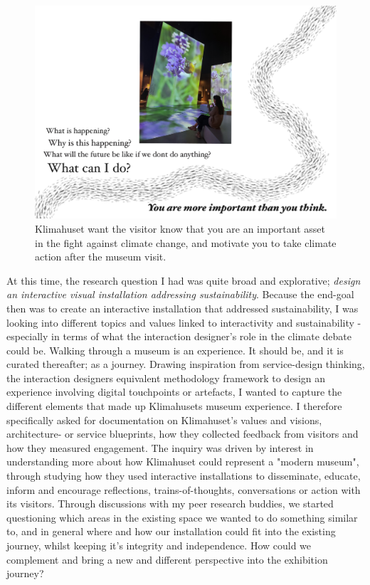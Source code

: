 \begin{figure}[H]
\includegraphics[width=12cm]{pictures/klimahuset/important.jpg}
\caption{Klimahuset want the visitor know that you are an important asset in the fight against climate change, and motivate you to take climate action after the museum visit.}
\centering 
\end{figure}

At this time, the research question I had was quite broad and explorative; \emph{design an interactive visual installation addressing sustainability}. Because the end-goal then was to create an interactive installation that addressed sustainability, I was looking into different topics and values linked to interactivity and sustainability - especially in terms of what the interaction designer's role in the climate debate could be. Walking through a museum is an experience. It should be, and it is curated thereafter; as a journey. Drawing inspiration from service-design thinking, the interaction designers equivalent methodology framework to design an experience involving digital touchpoints or artefacts, I wanted to capture the different elements that made up Klimahusets museum experience. I therefore specifically asked for documentation on Klimahuset's values and visions, architecture- or service blueprints, how they collected feedback from visitors and how they measured engagement. The inquiry was driven by interest in understanding more about how Klimahuset could represent a "modern museum", through studying how they used interactive installations to disseminate, educate, inform and encourage reflections, trains-of-thoughts, conversations or action with its visitors. Through discussions with my peer research buddies, we started questioning which areas in the existing space we wanted to do something similar to, and in general where and how our installation could fit into the existing journey, whilst keeping it’s integrity and independence. How could we complement and bring a new and different perspective into the exhibition journey?


